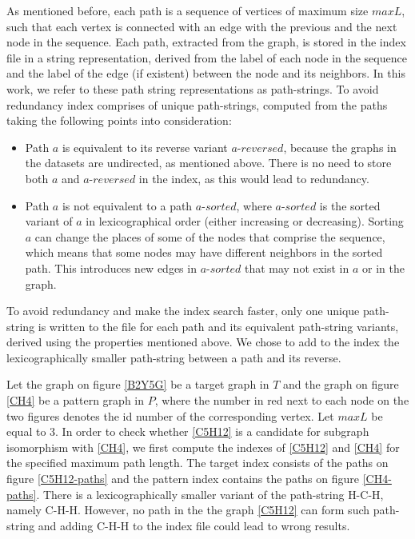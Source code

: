 \documentclass{l4proj}
\newcounter{example}[section]
\begin{document}
As mentioned before, each path is a sequence of vertices of maximum size $maxL$, such that each vertex is connected with an edge with the previous and the next node in the sequence. Each path, extracted from the graph, is stored in the index file in a string representation, derived from the label of each node in the sequence and the label of the edge (if existent) between the node and its neighbors. In this work, we refer to these path string representations as path-strings. To avoid redundancy index comprises of unique path-strings, computed from the paths taking the following points into consideration:
\begin{itemize}
\item Path $a$ is equivalent to its reverse variant $a$-$reversed$, because the graphs in the datasets are undirected, as mentioned above. There is no need to store both $a$ and $a$-$reversed$ in the index, as this would lead to redundancy.
\item Path $a$ is not equivalent to a path $a$-$sorted$, where $a$-$sorted$ is the sorted variant of $a$ in lexicographical order (either increasing or decreasing). Sorting $a$ can change the places of some of the nodes that comprise the sequence, which means that some nodes may have different neighbors in the sorted path. This introduces new edges in $a$-$sorted$ that may not exist in $a$ or in the graph.
\end{itemize}
To avoid redundancy and make the index search faster, only one unique path-string is written to the file for each path and its equivalent path-string variants, derived using the properties mentioned above. We chose to add to the index the lexicographically smaller path-string between a path and its reverse. \par
Let the graph on figure \ref{B2Y5G} be a target graph in $T$ and the graph on figure \ref{CH4} be a pattern graph in $P$, where the number in red next to each node on the two figures denotes the id number of the corresponding vertex. Let $maxL$ be equal to 3. In order to check whether \ref{C5H12} is a candidate for subgraph isomorphism with \ref{CH4}, we first compute the indexes of \ref{C5H12} and \ref{CH4} for the specified maximum path length. The target index consists of the paths on figure \ref{C5H12-paths} and the pattern index contains the paths on figure \ref{CH4-paths}. There is a lexicographically smaller variant of the path-string \textrm{H-C-H}, namely \textrm{C-H-H}. However, no path in the the graph \ref{C5H12} can form such path-string and adding \textrm{C-H-H} to the index file could lead to wrong results.\par
\end{document}
